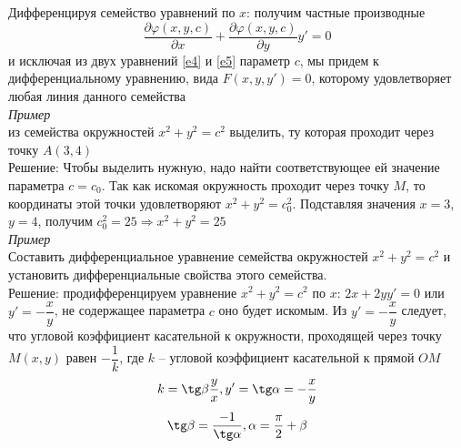 \documentclass{article}
\numberwithin{equation}{section}
\begin{document}
\\\\
Дифференцируя семейство уравнений по $x$: получим частные производные
\begin{equation}\label{e5}
\dfrac{\partial\varphi(x,y,c)}{\partial x}+\dfrac{\partial\varphi(x,y,c)}{\partial y}y'=0
\end{equation}
и исключая из двух уравнений \ref{e4} и \ref{e5} параметр $c$, мы придем к дифференциальному уравнению, вида $F(x,y,y')=0$, которому удовлетворяет любая линия данного семейства\\
\textit{Пример}\\
из семейства окружностей $x^2+y^2=c^2$ выделить, ту которая проходит через точку $A(3,4)$\\
Решение: Чтобы выделить нужную, надо найти соответствующее ей значение параметра $c=c_0$. Так как искомая окружность проходит через точку $M$, то координаты этой точки удовлетворяют $x^2+y^2=c_0^2$. Подставляя значения $x=3$, $y=4$, получим $c_0^2=25\Rightarrow x^2+y^2=25$\\
\textit{Пример}\\
Составить дифференциальное уравнение семейства окружностей $x^2+y^2=c^2$ и установить дифференциальные свойства этого семейства.\\
Решение: продифференцируем уравнение $x^2+y^2=c^2$ по $x$: $2x+2yy'=0$ или $y'=-\dfrac{x}{y}$, не содержащее параметра $c$ оно будет искомым. Из $y'=-\dfrac{x}{y}$ следует, что угловой коэффициент касательной к окружности, проходящей через точку $M(x,y)$ равен $-\dfrac{1}{k}$, где $k$ -- угловой коэффициент касательной к прямой $OM$
$$k=\tg\beta\dfrac{y}{x}, y'=\tg\alpha=-\dfrac{x}{y}$$
$$\tg\beta=\dfrac{-1}{\tg\alpha}, \alpha=\dfrac{\pi}{2}+\beta$$
\\
\end{document}
